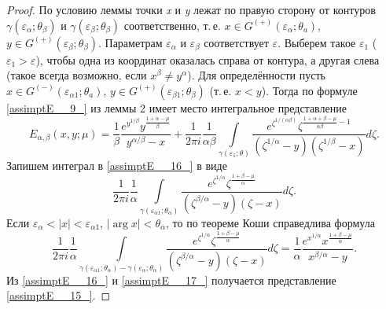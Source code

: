 {\begin{proof}
По условию леммы точки \textit{x} и \textit{y} лежат по правую сторону от контуров
$\gamma \left(\varepsilon _{\alpha } ;\theta _{\beta } \right)$ и
$\gamma (\varepsilon _\beta  ;\theta _\beta )$ соответственно, т.\,е.
$x\in G^{(+)} (\varepsilon_\alpha; \theta_a)$,
$y\in G^{(+)} (\varepsilon _\beta  ;\theta _\beta )$.
Параметрам $\varepsilon _{\alpha } $ и $\varepsilon _{\beta } $ соответствует $\varepsilon $.
Выберем такое $\varepsilon _{1}$ ($\varepsilon _{1} >\varepsilon $), чтобы одна
из координат оказалась справа от контура, а другая слева (такое всегда возможно,
если $x^{\beta } \ne y^{\alpha }$). Для определённости пусть
$x\in G^{(-)} (\varepsilon_{\alpha 1}; \theta_a) $,
$y\in G^{(+)} (\varepsilon_{\beta 1}; \theta _\beta) $
(т.\,е. $x<y$). Тогда по формуле \eqref{assimptE__9_} из леммы 2 имеет место интегральное представление
\begin{equation}
\label{assimptE__16_}
E_{\alpha, \beta }  (x, y; \mu)=\frac{1}{\beta } \frac{e^{y^{1/\beta} } y^{\frac{1+\alpha -\mu }{\beta } } }{y^{\alpha/\beta}  -x} +\frac{1}{2\pi i} \frac{1}{\alpha \beta } \int\limits_{\gamma \left(\varepsilon _{1} ;\theta \right)}\frac{e^{\zeta ^{1/(\alpha \beta)} }   \zeta ^{\frac{1+\alpha +\beta -\mu }{\alpha \beta } -1} }{\left(\zeta ^{1/ \alpha}  -y\right)\left(\zeta ^{1/\beta} -x\right)} d \zeta .
\end{equation}
Запишем интеграл в \eqref{assimptE__16_} в виде
\begin{equation*}
\frac{1}{2\pi i} \frac{1}{\alpha } \int\limits_{\gamma \left(\varepsilon _{\alpha 1} ;\theta _{\alpha } \right)}\frac{e^{\zeta ^{1/ \alpha}  } \zeta ^{\frac{1+\beta -\mu }{\alpha } } }{\left(\zeta^{\beta/ \alpha}  -y\right)\left(\zeta -x\right)} d \zeta .
\end{equation*}
Если $\varepsilon _{\alpha } <|x|<\varepsilon _{\alpha 1} $,
$|\arg x|<\theta _{\alpha }$, то по теореме Коши справедлива формула
\begin{equation}
\label{assimptE__17_}
\frac{1}{2\pi i} \frac{1}{\alpha } \int\limits_{\gamma \left(\varepsilon _{\alpha 1} ;\theta _{\alpha } \right)-\gamma (\varepsilon_\alpha; \theta_\alpha) }\frac{e^{\zeta ^{1/ \alpha}  } \zeta ^{\frac{1+\beta -\mu }{\alpha } } }{\left(\zeta^{\beta/ \alpha}  -y\right)\left(\zeta -x\right)} d \zeta =\frac{1}{\alpha } \frac{e^{x^{1/ \alpha}  } x^{\frac{1+\beta -\mu }{\alpha } } }{x^{\beta /\alpha} -y} .
\end{equation}
Из \eqref{assimptE__16_} и \eqref{assimptE__17_} получается представление \eqref{assimptE__15_}.
\end{proof}

}
